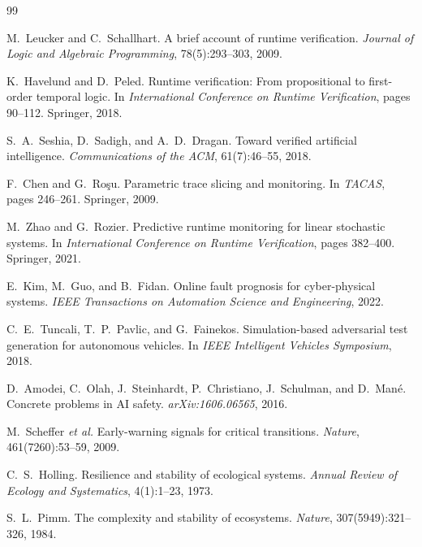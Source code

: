 \documentclass{llncs}
\begin{document}


\begin{thebibliography}{99}

M.~Leucker and C.~Schallhart.
A brief account of runtime verification.
\textit{Journal of Logic and Algebraic Programming}, 78(5):293--303, 2009.

K.~Havelund and D.~Peled.
Runtime verification: From propositional to first-order temporal logic.
In \textit{International Conference on Runtime Verification}, pages 90--112.
Springer, 2018.

S.~A.~Seshia, D.~Sadigh, and A.~D.~Dragan.
Toward verified artificial intelligence.
\textit{Communications of the ACM}, 61(7):46--55, 2018.

F.~Chen and G.~Ro\c{s}u.
Parametric trace slicing and monitoring.
In \textit{TACAS}, pages 246--261. Springer, 2009.

M.~Zhao and G.~Rozier.
Predictive runtime monitoring for linear stochastic systems.
In \textit{International Conference on Runtime Verification}, pages 382--400.
Springer, 2021.

E.~Kim, M.~Guo, and B.~Fidan.
Online fault prognosis for cyber-physical systems.
\textit{IEEE Transactions on Automation Science and Engineering}, 2022.

C.~E.~Tuncali, T.~P.~Pavlic, and G.~Fainekos.
Simulation-based adversarial test generation for autonomous vehicles.
In \textit{IEEE Intelligent Vehicles Symposium}, 2018.

D.~Amodei, C.~Olah, J.~Steinhardt, P.~Christiano, J.~Schulman,
and D.~Man{\'e}.
Concrete problems in AI safety.
\textit{arXiv:1606.06565}, 2016.

M.~Scheffer \textit{et al.}
Early-warning signals for critical transitions.
\textit{Nature}, 461(7260):53--59, 2009.

C.~S.~Holling.
Resilience and stability of ecological systems.
\textit{Annual Review of Ecology and Systematics}, 4(1):1--23, 1973.

S.~L.~Pimm.
The complexity and stability of ecosystems.
\textit{Nature}, 307(5949):321--326, 1984.


\end{thebibliography}
\end{document}
